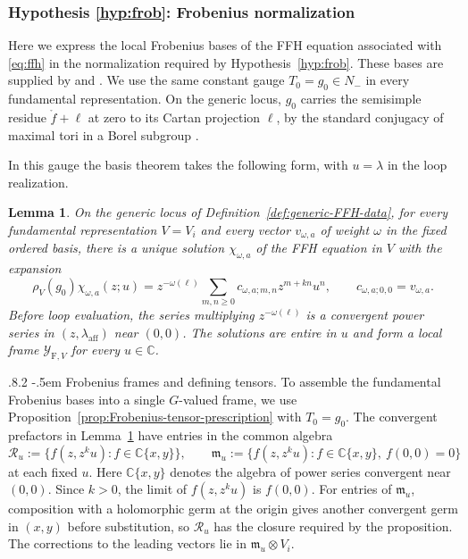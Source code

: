 \documentclass[11pt,leqno]{amsart}
\makeatletter
\numberwithin{equation}{section}
\renewcommand\paragraph{\@startsection{paragraph}{4}{\z@}%
  {.8\baselineskip \@plus .2\baselineskip}%
  {-.5em}%
  {\normalfont\normalsize\bfseries}}
\theoremstyle{plain}
\newtheorem{lemma}[theorem]{Lemma}
\theoremstyle{definition}
\theoremstyle{plain}
\theoremstyle{definition}
\theoremstyle{remark}
\makeatother
\begin{document}
\subsubsection{Hypothesis \ref{hyp:frob}: Frobenius normalization}\label{sec:FFH-hyp-frob}

Here we express the local Frobenius bases of the FFH equation associated with \eqref{eq:ffh} in the normalization required by Hypothesis~\ref{hyp:frob}.  These bases are supplied by \cite[Proposition~5.10 and Corollary~5.11]{MRhigher2020} and \cite[Proposition~3.14]{MR2024}.  We use the same constant gauge $T_0=g_0\in N_-$ in every fundamental representation.  On the generic locus, $g_0$ carries the semisimple residue $\mathring f+\ell$ at zero to its Cartan projection $\ell$, by the standard conjugacy of maximal tori in a Borel subgroup \cite[16.29(d) and Theorem~16.33]{Milne2017}.

In this gauge the basis theorem takes the following form, with $u=\lambda$ in the loop realization.\nopagebreak[4]
\begin{lemma}\label{lem:FFH-Frobenius-basis}
On the generic locus of Definition~\ref{def:generic-FFH-data}, for every fundamental representation $V=V_i$ and every vector $v_{\omega,a}$ of weight $\omega$ in the fixed ordered basis, there is a unique solution $\chi_{\omega,a}$ of the FFH equation in $V$ with the expansion
\begin{equation}\label{eq:declared-FFH-Frobenius-class}
 \rho_V(g_0)\chi_{\omega,a}(z;u)
 =z^{-\omega(\ell)}\sum_{m,n\ge0}c_{\omega,a;m,n}z^{m+kn}u^n,
 \qquad c_{\omega,a;0,0}=v_{\omega,a}.
\end{equation}
Before loop evaluation, the series multiplying $z^{-\omega(\ell)}$ is a convergent power series in $(z,\lambda_{\mathrm{aff}})$ near $(0,0)$.  The solutions are entire in $u$ and form a local frame $\mathcal Y_{\mathrm F,V}$ for every $u\in\mathbb C$.
\end{lemma}

\paragraph{Frobenius frames and defining tensors.}
To assemble the fundamental Frobenius bases into a single $G$-valued frame, we use Proposition~\ref{prop:Frobenius-tensor-prescription} with $T_0=g_0$.  The convergent prefactors in Lemma~\ref{lem:FFH-Frobenius-basis} have entries in the common algebra
\[
 \mathcal R_u:=\{f(z,z^ku):f\in\mathbb C\{x,y\}\},
 \qquad
 \mathfrak m_u:=\{f(z,z^ku):f\in\mathbb C\{x,y\},\ f(0,0)=0\}
\]
at each fixed $u$.  Here $\mathbb C\{x,y\}$ denotes the algebra of power series convergent near $(0,0)$.  Since $k>0$, the limit of $f(z,z^ku)$ is $f(0,0)$.  For entries of $\mathfrak m_u$, composition with a holomorphic germ at the origin gives another convergent germ in $(x,y)$ before substitution, so $\mathcal R_u$ has the closure required by the proposition.  The corrections to the leading vectors lie in $\mathfrak m_u\otimes V_i$.
\end{document}

